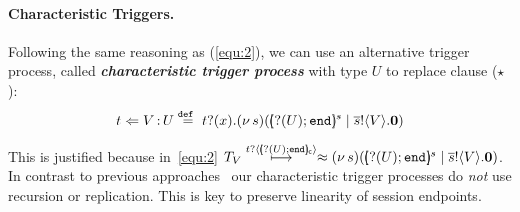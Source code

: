 

\paragraph{Characteristic Triggers.}
Following the same reasoning as (\ref{equ:2}), 
we can use an alternative trigger process, called
{\bf\em characteristic trigger process} with type 
$U$ to replace clause
($\star$): %
\begin{equation}
	\label{eq:4}
	 {
	~~t \Leftarrow V{\,:\,}U \stackrel{\mathtt{def}\ }{=}t ?(x) .(\nu\, s)(\ensuremath{[\!\!(? (U) ; \mathtt{end})\!\!]^{s}} \;|\;\overline{s} !\langle V \rangle .\mathbf{0})~~
	}
\end{equation}

\noi
This is justified because in~\eqref{equ:2} $T_V \hby{\bactinp{t}{\omapchar{\btinp{U} \tinact}}} \wbc \newsp{s}{\mapchar{\btinp{U} \tinact}{s} \Par \bout{\dual{s}}{V} \inact }$.
\noi 
{}
In contrast to previous approaches~\cite{SangiorgiD:expmpa,JeffreyR05} 
our %
 characteristic trigger processes 
do {\em not} use recursion or 
replication. This is key to preserve linearity of session endpoints.  


\begin{comment}
\myparagraph{Refined Input Transitions.}
Based on 
the above discussion, we refine 
the (early) transition rule for input actions. 
The refined transition rule for input roughly becomes 
(see \defref{def:rlts} for details):
$$
\boxed{
~~P \by{\bactinp{n}{V}} P' ~\land~ (V = m \vee V \scong \abs{{x}}{\binp{t}{y} (\appl{y}{{x}})} \vee  V \scong \omapchar{U}  \textrm{ with } t \textrm{ fresh}) ~~\Rightarrow~~
P' \hby{\bactinp{n}{V}} P'~~}
$$
\noi
Thus, our refined LTS admits only names, trigger values, and characteristic values in inputs.
Note the distinction between standard and refined transitions: $\by{\bactinp{n}{V}}$ vs. $\hby{\bactinp{n}{V}}$.
Using this rule, we define an alternative  LTS
with refined 
\jpc{(higher-order)}
input. %
This refined LTS is used for 
characteristic  bisimulation 
($\fwb$, Def.~\ref{d:fwb}),
in which the demanding clause~$(\star)$ is replaced with 
a more tractable output clause based on 
characteristic 
trigger processes
\jpc{(cf.~\eqref{eq:4})}.
\end{comment}

